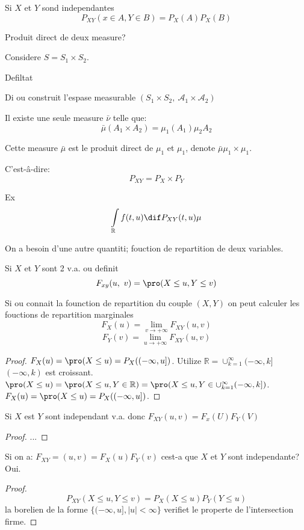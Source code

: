 Si $X$ et $Y$ sond independantes
$$P_{XY}(x\in A, Y\in B)=P_X(A) P_X(B)$$

Produit direct de deux measure?

Considere $S=S_1\times S_2$.

Defiltat

Di ou construit l'espase measurable $(S_1\times S_2,\ \mathcal{A}_1\times\mathcal{A}_2)$

Il existe une seule measure $\bar{\nu}$ telle que:
$$\bar{\mu}(A_1\times A_2)=\mu_1(A_1)\mu_2{A_2}$$

Cette measure $\bar{\mu}$ est le produit direct de $\mu_1$ et $\mu_1$, denote $\bar{\mu}\mu_1\times\mu_1$.

C'est-â-dire:
$$P_{XY}=P_X\times P_Y$$ %

Ex
$$\int\limits_{\mathbb{R}} f(t,u) \dif P_{XY}(t, u)\mu$$

On a besoin d'une autre quantiti; fouction de repartition de deux variables.

\begin{definition}
	Si $X$ et $Y$ sont 2 v.a. ou definit
	$$F_{xy}(u,\ v)=\pro (X\leq u, Y\leq v)$$
\end{definition}

\begin{proposition}
	Si ou connait la founction de repartition du couple $(X,Y)$ on peut calculer les fouctions de repartition marginales
	$$F_X(u)=\lim\limits_{v\rightarrow +\infty}F_{XY}(u, v)$$
	$$F_Y(v)=\lim\limits_{u\rightarrow +\infty}F_{XY}(u, v)$$
\end{proposition}
\begin{proof}
	$F_X(u)=\pro (X\leq u)=P_X((-\infty, u])$. Utilize $\mathbb{R}=\cup^\infty_{k=1}(-\infty, k]$ $(-\infty, k)$ est croissant. $\pro (X\leq u)=\pro (X\leq u, Y\in\mathbb{R})=\pro (X\leq u, Y\in\cup_{k=1}^\infty(-\infty, k])$. $F_X(u)=\pro (X\leq u)=P_X((-\infty, u])$.
\end{proof}

\begin{proposition}
	Si $X$ est $Y$ sont independant v.a. donc $F_{XY}(u, v)=F_x(U) F_Y(V)$
\end{proposition}
\begin{proof}
	...
\end{proof}

\begin{proposition}	
	Si on a: $F_{XY}=(u, v)=F_X(u)F_Y(v)$ cest-a que $X$ et $Y$ sont independante? Oui.
\end{proposition}
\begin{proof}
	$$P_{XY}(X\leq u, Y\leq v)=P_X(X\leq u)P_Y(Y\leq u)$$
	la borelien de la forme $\{(-\infty, u], |u|<\infty\}$ verifiet le properte de l'intersection firme.
\end{proof}

